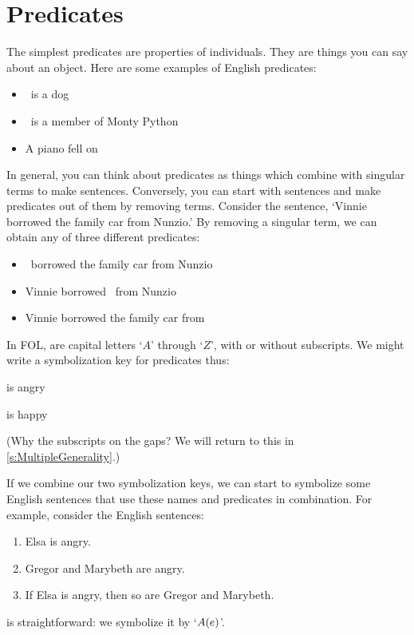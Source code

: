 \section{Predicates}
The simplest predicates are properties of individuals. They are things you can say about an object. Here are some examples of English predicates:
	\begin{itemize}
		\item \blank\ is a dog
		\item \blank\ is a member of Monty Python
		\item A piano fell on \blank
	\end{itemize}
In general, you can think about predicates as things which combine with singular terms to make sentences. Conversely, you can start with sentences and make predicates out of them by removing terms. Consider the sentence, `Vinnie borrowed the family car from Nunzio.' By removing a singular term, we can obtain any of three different predicates:
	\begin{itemize}
		\item \blank\ borrowed the family car from Nunzio\\
		\item Vinnie borrowed \blank\ from Nunzio\\
		\item Vinnie borrowed the family car from \blank
	\end{itemize}
In FOL,  are capital letters `$A$' through `$Z$', with or without subscripts. We might write a symbolization key for predicates thus:
	\begin{ekey}
		\item[\atom{A}{x}]  is angry
		\item[\atom{H}{x}]  is happy
	\end{ekey}
        (Why the subscripts on the gaps? We will return to this in \cref{s:MultipleGenerality}.)


If we combine our two symbolization keys, we can start to symbolize some English sentences that use these names and predicates in combination. For example, consider the English sentences:
	\begin{enumerate}
		\item\label{terms1} Elsa is angry.
		\item\label{terms2a} Gregor and Marybeth are angry.
		\item\label{terms2} If Elsa is angry, then so are Gregor and Marybeth.
	\end{enumerate}
 is straightforward: we symbolize it by `$A(e)$'.

